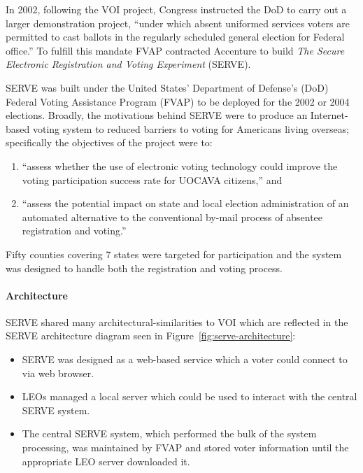 
In 2002, following the VOI project, Congress instructed the DoD to carry out a
larger demonstration project, ``under which absent uniformed services voters are
permitted to cast ballots in the regularly scheduled general election for
Federal office.''\cite{serve-bill} To fulfill this mandate FVAP contracted
Accenture to build \emph{The Secure Electronic Registration and Voting
Experiment} (SERVE).

SERVE was built under the United States' Department of Defense's (DoD) Federal
Voting Assistance Program (FVAP) to be deployed for the 2002 or 2004 elections.
Broadly, the motivations behind SERVE were to produce an Internet-based voting
system to reduced barriers to voting for Americans living overseas; specifically
the objectives of the project were to:

\begin{enumerate}
  \item ``assess whether the use of electronic voting technology could improve the
    voting participation success rate for UOCAVA
    citizens,''\cite{dod-expanding-electronic-voting} and

  \item ``assess the potential impact on state and local election administration
    of an automated alternative to the conventional by-mail process of absentee
    registration and voting.''\cite{dod-expanding-electronic-voting}
\end{enumerate}

Fifty counties covering 7 states were targeted for participation and the system was
designed to handle both the registration and voting process.

\paragraph{Architecture}
SERVE shared many architectural-similarities to VOI which are reflected in the
SERVE architecture diagram seen in Figure~\ref{fig:serve-architecture}\@:

\begin{itemize}
  \item SERVE was designed as a web-based service which a voter could connect to
    via web browser.

  \item LEOs managed a local server which could be used to interact with
    the central SERVE system.

  \item The central SERVE system, which performed the bulk of the system
    processing, was maintained by FVAP and stored voter information until the
    appropriate LEO server downloaded it.
\end{itemize}

